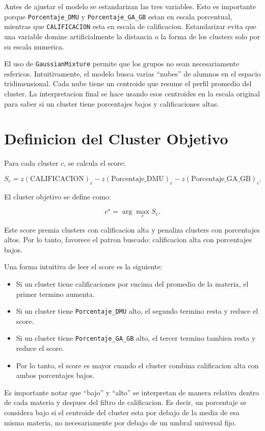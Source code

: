 \documentclass[11pt,letterpaper]{article}
\newcommand{\code}[1]{\texttt{#1}}
\begin{document}
Antes de ajustar el modelo se estandarizan las tres variables. Esto es importante porque \code{Porcentaje\_DMU} y \code{Porcentaje\_GA\_GB} estan en escala porcentual, mientras que \code{CALIFICACION} esta en escala de calificacion. Estandarizar evita que una variable domine artificialmente la distancia o la forma de los clusters solo por su escala numerica.

El uso de \code{GaussianMixture} permite que los grupos no sean necesariamente esfericos. Intuitivamente, el modelo busca varias ``nubes'' de alumnos en el espacio tridimensional. Cada nube tiene un centroide que resume el perfil promedio del cluster. La interpretacion final se hace usando esos centroides en la escala original para saber si un cluster tiene porcentajes bajos y calificaciones altas.

\section{Definicion del Cluster Objetivo}

Para cada cluster \(c\), se calcula el score:

\[
S_c =
z(\text{CALIFICACION})_c
- z(\text{Porcentaje\_DMU})_c
- z(\text{Porcentaje\_GA\_GB})_c.
\]

El cluster objetivo se define como:

\[
c^\star = \arg\max_c S_c.
\]

Este score premia clusters con calificacion alta y penaliza clusters con porcentajes altos. Por lo tanto, favorece el patron buscado: calificacion alta con porcentajes bajos.

Una forma intuitiva de leer el score es la siguiente:

\begin{itemize}
    \item Si un cluster tiene calificaciones por encima del promedio de la materia, el primer termino aumenta.
    \item Si un cluster tiene \code{Porcentaje\_DMU} alto, el segundo termino resta y reduce el score.
    \item Si un cluster tiene \code{Porcentaje\_GA\_GB} alto, el tercer termino tambien resta y reduce el score.
    \item Por lo tanto, el score es mayor cuando el cluster combina calificacion alta con ambos porcentajes bajos.
\end{itemize}

Es importante notar que ``bajo'' y ``alto'' se interpretan de manera relativa dentro de cada materia y despues del filtro de calificacion. Es decir, un porcentaje se considera bajo si el centroide del cluster esta por debajo de la media de esa misma materia, no necesariamente por debajo de un umbral universal fijo.
\end{document}
